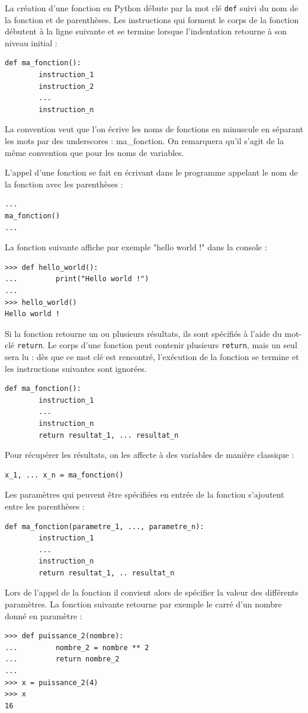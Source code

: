 \documentclass[12pt, a4paper]{article}
\begin{document}
La création d'une fonction en Python débute par la mot clé \lstinline{def} suivi du nom de la fonction et de parenthèses. Les instructions qui forment le corps de la fonction débutent à la ligne suivante et se termine lorsque l'indentation retourne à son niveau initial :
\begin{lstlisting}
def ma_fonction():
		instruction_1
		instruction_2
		...
		instruction_n
\end{lstlisting}

La convention veut que l'on écrive les noms de fonctions en minuscule en séparant les mots par des underscores : ma\_fonction. On remarquera qu'il s'agit de la même convention que pour les noms de variables.

L'appel d'une fonction se fait en écrivant dans le programme appelant le nom de la fonction avec les parenthèses : 
\begin{lstlisting}
...
ma_fonction()
...
\end{lstlisting}

La fonction suivante affiche par exemple "hello world !" dans la console :
\begin{lstlisting}
>>> def hello_world():
...			print("Hello world !")
...
>>> hello_world()
Hello world !
\end{lstlisting}

Si la fonction retourne un ou plusieurs résultats, ils sont spécifiés à l'aide du mot-clé \lstinline{return}. Le corps d'une fonction peut contenir plusieurs \lstinline{return}, mais un seul sera lu : dès que ce mot clé est rencontré, l'exécution de la fonction se termine et les instructions suivantes sont ignorées.
\begin{lstlisting}
def ma_fonction():
		instruction_1
		...
		instruction_n
		return resultat_1, ... resultat_n
\end{lstlisting}

Pour récupérer les résultats, on les affecte à des variables de manière classique :
\begin{lstlisting}
x_1, ... x_n = ma_fonction()
\end{lstlisting}

Les paramètres qui peuvent être spécifiées en entrée de la fonction s'ajoutent entre les parenthèses :
\begin{lstlisting}
def ma_fonction(parametre_1, ..., parametre_n):
		instruction_1
		...
		instruction_n
		return resultat_1, .. resultat_n
\end{lstlisting}

Lors de l'appel de la fonction il convient alors de spécifier la valeur des différents paramètres. La fonction suivante retourne par exemple le carré d'un nombre donné en paramètre :
\begin{lstlisting}
>>> def puissance_2(nombre):
...			nombre_2 = nombre ** 2
... 		return nombre_2
...
>>> x = puissance_2(4)
>>> x
16
\end{lstlisting}
\end{document}
